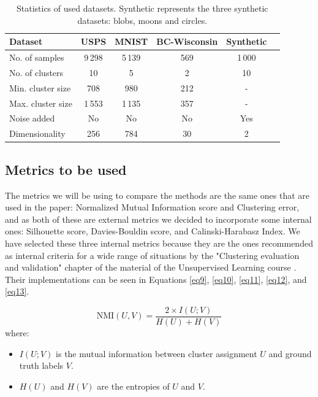 \documentclass[
	10pt,
	parskip=half-,	
	paper=a4,
	english
	]{scrartcl}
\begin{document}
\begin{table}[h]
\centering
\caption{Statistics of used datasets. Synthetic represents the three synthetic datasets: blobs, moons and circles.}
\begin{tabular}{lccccc}
\toprule
\textbf{Dataset} & \textbf{USPS} & \textbf{MNIST} & \textbf{BC-Wisconsin} & \textbf{Synthetic}\\
\midrule
No. of samples     & 9\,298 & 5\,139 & 569 & 1\,000 \\
No. of clusters    & 10     & 5     & 2    & 10   \\
Min. cluster size  & 708   & 980   & 212     & - \\
Max. cluster size  & 1\,553   & 1\,135  & 357     & - \\
Noise added  & No   & No  & No     & Yes \\
Dimensionality     & 256    & 784   & 30   & 2 \\
\bottomrule
\end{tabular}
\end{table}

\subsection{Metrics to be used}

The metrics we will be using to compare the methods are the same ones that are used in the paper: Normalized Mutual Information score and Clustering error, and as both of these are external metrics we decided to incorporate some internal ones: Silhouette score, Davies-Bouldin score, and Calinski-Harabasz Index. We have selected these three internal metrics because they are the ones recommended as internal criteria for a wide range of situations by the "Clustering evaluation and validation" chapter of the material of the Unsupervised Learning course \cite{citation2}. Their implementations can be seen in Equations \ref{eq9}, \ref{eq10}, \ref{eq11}, \ref{eq12}, and \ref{eq13}.

\begin{equation}
    \text{NMI}(U, V) = \frac{2 \times I(U; V)}{H(U) + H(V)}
    \label{eq9}
\end{equation}
where:
\begin{itemize}
    \item $I(U; V)$ is the mutual information between cluster assignment $U$ and ground truth labels $V$.
    \item $H(U)$ and $H(V)$ are the entropies of $U$ and $V$.
\end{itemize}
\end{document}
